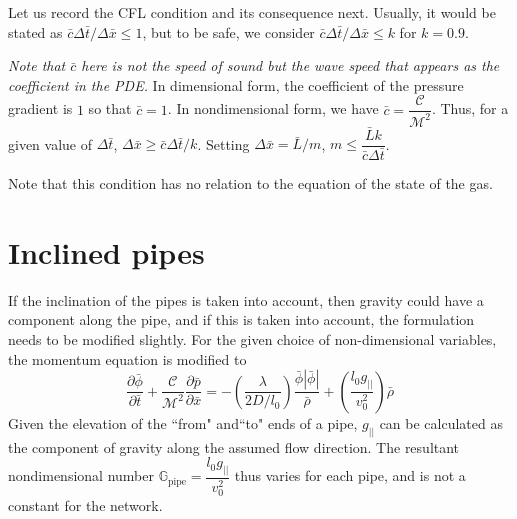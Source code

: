 \documentclass{amsart}
\begin{document}





Let us record the CFL condition and its consequence next. Usually, it would be stated as $\bar{c}\Delta \bar{t}/ \Delta \bar{x} \leq 1$, but to be safe, we consider 
$\bar{c}\Delta \bar{t}/ \Delta \bar{x} \leq k$ for $k= 0.9$.

\emph{Note that $\bar{c}$ here is not the speed of sound but the wave speed that appears as the coefficient in the PDE.}
In dimensional form, the coefficient of the pressure gradient is $1$ so that $\bar{c}=1$. In nondimensional form, we have $\bar{c} = \dfrac{\mathcal{C}}{\mathcal{M}^2}$.
Thus, for a given value of $\Delta \bar{t}$, $\Delta \bar{x} \geq \bar{c}\Delta \bar{t}/k$. Setting $\Delta \bar{x} = \bar{L}/m$,  $m \leq \dfrac{\bar{L} k}{\bar{c}\Delta \bar{t}}$.

Note that this condition has no relation to the equation of the state of the gas.

\section{Inclined pipes}
If the inclination of the pipes is taken into account, then gravity could have a component along the pipe, and if this is taken into account, the formulation needs to be modified slightly.
For the given choice of non-dimensional variables, the momentum equation is modified to
$$\dfrac{\partial \bar{\phi}}{\partial \bar{t}} + \dfrac{\mathcal{C}}{\mathcal{M}^2}\dfrac{\partial \bar{p}}{\partial \bar{x}} = -\left( \dfrac{\lambda}{2D/l_0} \right) \dfrac{\bar{\phi}|\bar{\phi}|}{\bar{\rho}} + 
\left ( \dfrac{l_0g_{||}}{v_0^2} \right )\bar{\rho}$$
Given the elevation of the ``from" and``to" ends of a pipe, $g_{||}$ can be calculated as the component of gravity along the assumed flow direction. The resultant nondimensional number $\mathbb{G}_{\mathrm{pipe}} = \dfrac{l_0 g_{||}}{v_0^2}$ thus varies for each pipe, and is not a constant for the network.
\end{document}
